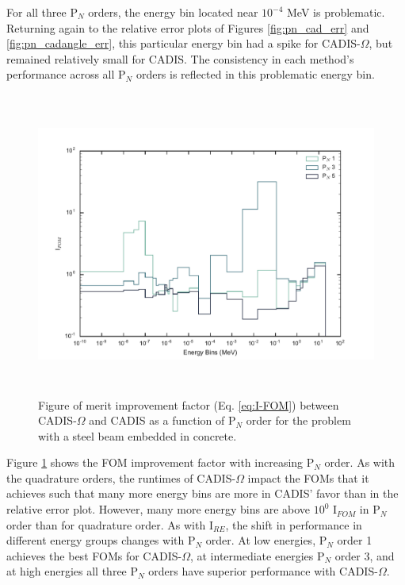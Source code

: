 For all three
P$_N$ orders, the energy bin located near $10^{-4}$ MeV is problematic.
Returning again to the relative error plots of Figures \ref{fig:pn_cad_err}
and \ref{fig:pn_cadangle_err}, this
particular energy bin had a spike for CADIS-$\Omega$, but remained relatively
small for CADIS. The consistency in each method's performance across all P$_N$
orders is reflected in this problematic energy bin.

\begin{figure}[h!]
  \centering
  \includegraphics[height=10cm]{./chapters/characterization_probs/figures/angle/prob_1/compare_fom_pN.pdf}
  \caption[Figure of merit improvement factor (Eq. \eqref{eq:I-FOM}) between CADIS-$\Omega$ and
  CADIS as a function of P$_N$ order for steel beam embedded in concrete.]
  {Figure of merit improvement factor (Eq. \eqref{eq:I-FOM}) between CADIS-$\Omega$ and
   CADIS as a function of P$_N$ order for the problem with a
   steel beam embedded in concrete.}
  \label{fig:prob_1_pN_I_FOM}
\end{figure}

Figure \ref{fig:prob_1_pN_I_FOM} shows the FOM improvement factor with
increasing P$_N$ order. As with the quadrature orders, the runtimes of
CADIS-$\Omega$ impact the FOMs that it achieves such that many more energy bins
are more in CADIS' favor than in the relative error plot. However, many more
energy bins are above $10^0$ I$_{FOM}$ in P$_N$ order than for quadrature order.
As with I$_{RE}$, the shift in performance in different energy groups changes
with P$_N$ order. At low energies, P$_N$ order 1 achieves the best FOMs for
CADIS-$\Omega$, at intermediate energies P$_N$ order 3, and at high energies all
three P$_N$ orders have superior performance with CADIS-$\Omega$.

